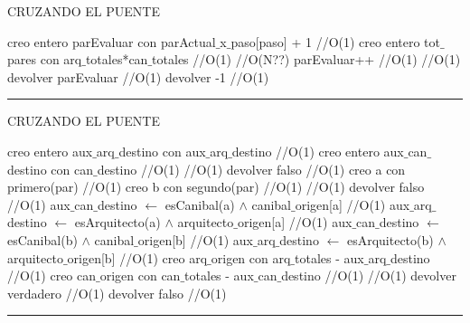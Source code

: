 \begin{algorithm}[H]
\caption{CRUZANDO EL PUENTE}
\begin{algorithmic}[1]
\state creo entero parEvaluar con parActual$\_$x$\_$paso[paso] + 1 \hfill //O(1)
\state creo entero tot$\_$pares con arq$\_$totales*can$\_$totales \hfill //O(1)
 \hfill //O(N??)
\state parEvaluar++ \hfill //O(1)
\endwhile
{} \hfill //O(1)
\state devolver  parEvaluar \hfill //O(1)
\Else
\state devolver -1 \hfill //O(1)
\endif
\EndFunction 
\end{algorithmic}
\hrule
{}
\end{algorithm}


\begin{algorithm}[H]
\caption{CRUZANDO EL PUENTE}
\begin{algorithmic}[1]
\state creo entero aux$\_$arq$\_$destino con aux$\_$arq$\_$destino \hfill //O(1)
\state creo entero aux$\_$can$\_$destino con can$\_$destino \hfill //O(1)
 \hfill //O(1)
\state devolver  falso \hfill //O(1)
\endif
\state creo a con primero(par) \hfill //O(1)
\state creo b con segundo(par) \hfill //O(1)
 \hfill //O(1)
\state devolver  falso \hfill //O(1)
\endif
\state aux$\_$can$\_$destino $\gets$  esCanibal(a) $\wedge$ canibal$\_$origen[a] \hfill //O(1)
\state aux$\_$arq$\_$destino $\gets$  esArquitecto(a) $\wedge$ arquitecto$\_$origen[a] \hfill //O(1)
\state aux$\_$can$\_$destino $\gets$  esCanibal(b) $\wedge$ canibal$\_$origen[b] \hfill //O(1)
\state aux$\_$arq$\_$destino $\gets$  esArquitecto(b) $\wedge$ arquitecto$\_$origen[b] \hfill //O(1)
\state creo arq$\_$origen con arq$\_$totales - aux$\_$arq$\_$destino \hfill //O(1)
\state creo can$\_$origen con can$\_$totales - aux$\_$can$\_$destino \hfill //O(1)
 \hfill //O(1)
\state devolver  verdadero \hfill //O(1)
\Else
\state devolver  falso \hfill //O(1)
\endif

\EndFunction 
\end{algorithmic}
\hrule
{}
\end{algorithm}


